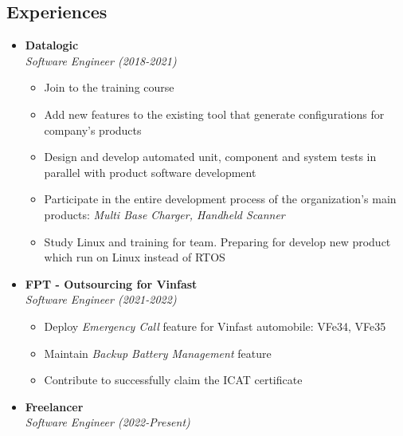 \documentclass[11pt,oneside,a4paper]{article}
\begin{document}
\begin{tcolorbox}
\begin{minipage}[t]{11cm}
\begin{tcolorbox}[grow to right by=0.75cm,colback=white,colframe=white]
            \section*{Experiences}
            \begin{itemize}
                \item 
                {
                    \textbf{Datalogic} \\
                    \emph{Software Engineer (2018-2021)}
                    \begin{itemize}[label=$\circ$]
                        \item {Join to the training course}
                        \item {Add new features to the existing tool that generate configurations for company's products}
                        \item {Design and develop automated unit, component and system tests in 
                        parallel with product software development}
                        \item {Participate in the entire development process of the organization's main products: 
                        \textit{Multi Base Charger, Handheld Scanner}}
                        \item {Study Linux and training for team. Preparing for develop new product which run on Linux instead of RTOS}
                    \end{itemize}
                }
                \item
                {
                    \textbf{FPT - Outsourcing for Vinfast} \\
                    \emph{Software Engineer (2021-2022)}
                    \begin{itemize}[label=$\circ$]
                        \item {Deploy \textit{Emergency Call} feature for Vinfast automobile: VFe34, VFe35}
                        \item {Maintain \textit{Backup Battery Management} feature}
                        \item {Contribute to successfully claim the ICAT certificate}
                    \end{itemize}
                }
                \item 
                {
                    \textbf{Freelancer} \\
                    \emph{Software Engineer (2022-Present)} \\
}
\end{itemize}
\end{tcolorbox}
\end{minipage}
\end{tcolorbox}
\end{document}
